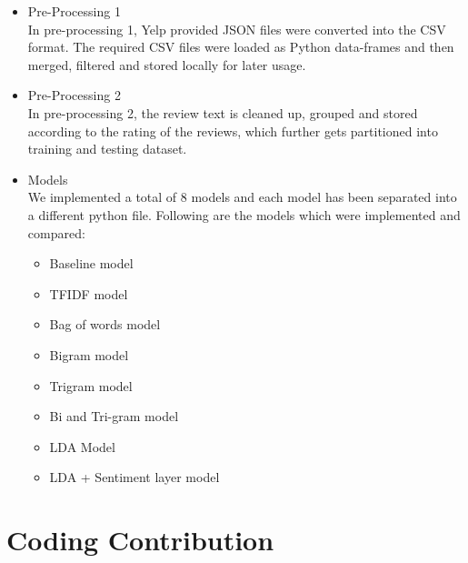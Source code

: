 \documentclass[paper=a4, fontsize=11pt]{scrartcl} %
\numberwithin{equation}{section} %
\numberwithin{figure}{section} %
\numberwithin{table}{section} %
\begin{document}
\begin{itemize}
\item	Pre-Processing 1\\
In pre-processing 1, Yelp provided JSON files were converted into the CSV format. The required CSV files were loaded as Python data-frames and then merged, filtered and stored locally for later usage.

\item	Pre-Processing 2\\
In pre-processing 2, the review text is cleaned up, grouped and stored according to the rating of the reviews, which further gets partitioned into training and testing dataset.

\item	Models\\
We implemented a total of 8 models and each model has been separated into a different python file. Following are the models which were implemented and compared:
\begin{itemize}
\item Baseline model
\item TFIDF model
\item Bag of words model
\item Bigram model
\item Trigram model
\item Bi and Tri-gram model
\item LDA Model
\item LDA + Sentiment layer model
\end{itemize}
\end{itemize}

\section{Coding Contribution}
\end{document}
